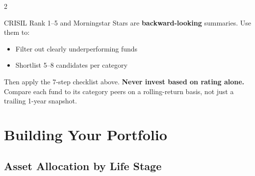 \documentclass[11pt,a4paper]{article}
\begin{document}
\begin{multicols}{2}
\vspace{5pt}

\begin{infobox}[title={Ratings: A Starting Point, Not the Destination}]
CRISIL Rank 1--5 and Morningstar Stars are \textbf{backward-looking} summaries.  Use them to:
\begin{itemize}
  \item Filter out clearly underperforming funds
  \item Shortlist 5--8 candidates per category
\end{itemize}
Then apply the 7-step checklist above.  \textbf{Never invest based on rating alone.}  Compare each fund to its category peers on a rolling-return basis, not just a trailing 1-year snapshot.
\end{infobox}

\end{multicols}

\section{Building Your Portfolio}

\subsection{Asset Allocation by Life Stage}
\end{document}

